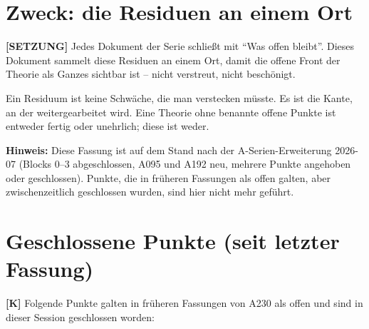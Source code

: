 \section{Zweck: die Residuen an einem Ort}

\textbf{[SETZUNG]} Jedes Dokument der Serie schließt mit \enquote{Was offen
bleibt}. Dieses Dokument sammelt diese Residuen an einem Ort, damit die offene
Front der Theorie als Ganzes sichtbar ist -- nicht verstreut, nicht beschönigt.

Ein Residuum ist keine Schwäche, die man verstecken müsste. Es ist die Kante, an
der weitergearbeitet wird. Eine Theorie ohne benannte offene Punkte ist entweder
fertig oder unehrlich; diese ist weder.

\textbf{Hinweis:} Diese Fassung ist auf dem Stand nach der A-Serien-Erweiterung
2026-07 (Blocks 0--3 abgeschlossen, A095 und A192 neu, mehrere Punkte angehoben
oder geschlossen). Punkte, die in früheren Fassungen als offen galten, aber
zwischenzeitlich geschlossen wurden, sind hier nicht mehr geführt.

\section{Geschlossene Punkte (seit letzter Fassung)}

\textbf{[K]} Folgende Punkte galten in früheren Fassungen von A230 als offen
und sind in dieser Session geschlossen worden:


